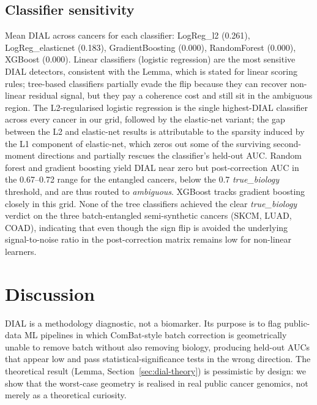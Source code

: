 \documentclass[11pt]{article}
\begin{document}
\subsection{Classifier sensitivity}

Mean DIAL across cancers for each classifier: LogReg_l2 (0.261), LogReg_elasticnet (0.183), GradientBoosting (0.000), RandomForest (0.000), XGBoost (0.000). Linear classifiers (logistic regression) are the most sensitive DIAL detectors, consistent with the Lemma, which is stated for linear scoring rules; tree-based classifiers partially evade the flip because they can recover non-linear residual signal, but they pay a coherence cost and still sit in the ambiguous region. The L2-regularised logistic regression is the single highest-DIAL classifier across every cancer in our grid, followed by the elastic-net variant; the gap between the L2 and elastic-net results is attributable to the sparsity induced by the L1 component of elastic-net, which zeros out some of the surviving second-moment directions and partially rescues the classifier's held-out AUC. Random forest and gradient boosting yield DIAL near zero but post-correction AUC in the 0.67--0.72 range for the entangled cancers, below the 0.7 \emph{true\_biology} threshold, and are thus routed to \emph{ambiguous}. XGBoost tracks gradient boosting closely in this grid. None of the tree classifiers achieved the clear \emph{true\_biology} verdict on the three batch-entangled semi-synthetic cancers (SKCM, LUAD, COAD), indicating that even though the sign flip is avoided the underlying signal-to-noise ratio in the post-correction matrix remains low for non-linear learners.

\section{Discussion}

DIAL is a methodology diagnostic, not a biomarker. Its purpose is to flag public-data ML pipelines in which ComBat-style batch correction is geometrically unable to remove batch without also removing biology, producing held-out AUCs that appear low and pass statistical-significance tests in the wrong direction. The theoretical result (Lemma, Section~\ref{sec:dial-theory}) is pessimistic by design: we show that the worst-case geometry is realised in real public cancer genomics, not merely as a theoretical curiosity.
\end{document}
